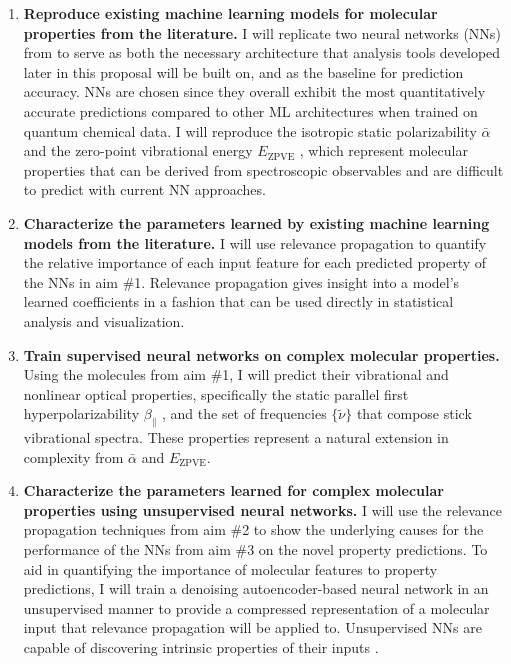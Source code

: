 \documentclass[12pt]{article}
\begin{document}
\begin{enumerate}
\item \textbf{Reproduce existing machine learning models for molecular properties from the literature.} I will replicate two neural networks (NNs) from \parencite{2017arXiv170205532F} to serve as both the necessary architecture that analysis tools developed later in this proposal will be built on, and as the baseline for prediction accuracy. NNs are chosen since they overall exhibit the most quantitatively accurate predictions compared to other ML architectures when trained on quantum chemical data. I will reproduce the isotropic static polarizability \(\bar{\alpha}\) \parencite{POC:POC407} and the zero-point vibrational energy \(E_\text{ZPVE}\) \parencite{doi:10.1063/1.2436891}, which represent molecular properties that can be derived from spectroscopic observables and are difficult to predict with current NN approaches.

\item \textbf{Characterize the parameters learned by existing machine learning models from the literature.} I will use relevance propagation \cite{10.1371/journal.pone.0130140,Binder2016,JMLR:v17:15-618} to quantify the relative importance of each input feature for each predicted property of the NNs in aim \#1. Relevance propagation gives insight into a model's learned coefficients in a fashion that can be used directly in statistical analysis and visualization.

\item \textbf{Train supervised neural networks on complex molecular properties.} Using the molecules from aim \#1, I will predict their vibrational and nonlinear optical properties, specifically the static parallel first hyperpolarizability \(\beta_{\parallel}\) \parencite{doi:10.1063/1.3134744}, and the set of frequencies \(\{\tilde{\nu}\}\) that compose stick vibrational spectra. These properties represent a natural extension in complexity from \(\bar{\alpha}\) and \(E_{\text{ZPVE}}\).

\item \textbf{Characterize the parameters learned for complex molecular properties using unsupervised neural networks.} I will use the relevance propagation techniques from aim \#2 to show the underlying causes for the performance of the NNs from aim \#3 on the novel property predictions. To aid in quantifying the importance of molecular features to property predictions, I will train a denoising autoencoder-based neural network in an unsupervised manner to provide a compressed representation of a molecular input that relevance propagation will be applied to. Unsupervised NNs are capable of discovering intrinsic properties of their inputs \cite{VincentPLarochelleH2008}.
\end{enumerate}
\end{document}

